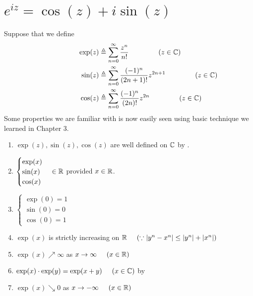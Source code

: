 \documentclass{report}
\begin{document}
\section{$e^{iz}=\cos (z)+ i \sin (z)$}
\begin{mdframed}
Suppose that we define 
\begin{align*}
  \hspace{2cm}\exp(z)&\triangleq \sum_{n=0}^\infty \frac{z^n}{n!}\hspace{1.5cm}(z\in\mathbb{C})\\
  \hspace{2cm}\sin (z)&\triangleq \sum_{n=0}^\infty \frac{(-1)^n}{(2n+1)!}z^{2n+1}\hspace{1.5cm}(z\in\mathbb{C})\\
  \hspace{2cm}\cos (z)&\triangleq \sum_{n=0}^\infty \frac{(-1)^n}{(2n)!}z^{2n}\hspace{1.5cm}(z\in\mathbb{C})
\end{align*}
Some properties we are familiar with is now easily seen using basic technique we learned in Chapter 3. 
\begin{enumerate}[label=(\alph*)]
  \item $\exp(z),\sin(z),\cos(z)$ are well defined on $\mathbb{C}$ by .  
  \item $\begin{cases}
    \exp(x)\\
    \sin(x)\\
    \cos(x)
  \end{cases}\in\mathbb{R}$ provided $x\in\mathbb{R}$. 
  \item $\begin{cases}
    \exp(0)=1 \\
    \sin(0)=0\\
    \cos (0)=1
  \end{cases}$
  \item $\exp(x)$ is strictly increasing on $\mathbb{R}\hspace{0.5cm}(\because \left|y^n-x^n\right|\leq \left|y^n\right|+\left|x^n\right|)$
  \item $\exp(x)\nearrow \infty$ as $x\to \infty\hspace{0.5cm}(x\in\mathbb{R})$ 
  \item $\exp(x)\cdot \exp(y)=\exp(x+y)\hspace{0.5cm}(x\in\mathbb{C})$ by 
  \item $\exp (x)\searrow 0$ as $x \to -\infty\hspace{0.5cm}(x\in\mathbb{R})$

\end{enumerate}
\end{mdframed}
\end{document}
